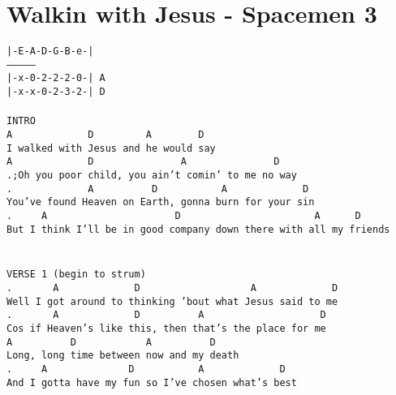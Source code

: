 \newpage
\section{Walkin with Jesus - Spacemen 3}
\label{Walkin with Jesus - Spacemen 3}
\texttt{|-E-A-D-G-B-e-|\\
---------------\\
|-x-0-2-2-2-0-|\ A\\
|-x-x-0-2-3-2-|\ D\\
\\
INTRO\\
A\ \ \ \ \ \ \ \ \ \ \ \ \ D\ \ \ \ \ \ \ \ \ A\ \ \ \ \ \ \ \ D\\
I\ walked\ with\ Jesus\ and\ he\ would\ say\\
A\ \ \ \ \ \ \ \ \ \ \ \ \ D\ \ \ \ \ \ \ \ \ \ \ \ \ \ \ A\ \ \ \ \ \ \ \ \ \ \ \ \ \ \ D\\
.;Oh\ you\ poor\ child,\ you\ ain't\ comin'\ to\ me\ no\ way\\
. \ \ \ \ \ \ \ \ \ \ \ \ A\ \ \ \ \ \ \ \ \ \ D\ \ \ \ \ \ \ \ \ \ \ A\ \ \ \ \ \ \ \ \ \ \ \ \ D\\
You've\ found\ Heaven\ on\ Earth,\ gonna\ burn\ for\ your\ sin\;\\
. \ \ \ \ A\ \ \ \ \ \ \ \ \ \ \ \ \ \ \ \ \ \ \ \ \ \ D\ \ \ \ \ \ \ \ \ \ \ \ \ \ \ \ \ \ \ \ \ \ \ A\ \ \ \ \ \ D\\
But\ I\ think\ I'll\ be\ in\ good\ company\ down\ there\ with\ all\ my\ friends\\
\\
\\
VERSE\ 1\ (begin\ to\ strum)\\
. \ \ \ \ \ \ A\ \ \ \ \ \ \ \ \ \ \ \ \ D\ \ \ \ \ \ \ \ \ \ \ \ \ \ \ \ \ \ \ A\ \ \ \ \ \ \ \ \ \ \ \ \ D\\
Well\ I\ got\ around\ to\ thinking\ 'bout\ what\ Jesus\ said\ to\ me\\
. \ \ \ \ \ \ A\ \ \ \ \ \ \ \ \ \ \ \ \ D\ \ \ \ \ \ \ \ \ \ A\ \ \ \ \ \ \ \ \ \ \ \ \ \ \ \ \ \ \ \ D\\
Cos\ if\ Heaven's\ like\ this,\ then\ that's\ the\ place\ for\ me\\
A\ \ \ \ \ \ \ \ \ \ D\ \ \ \ \ \ \ \ \ \ \ \ A\ \ \ \ \ \ \ \ \ \ D\\
Long,\ long\ time\ between\ now\ and\ my\ death\\
. \ \ \ \ A\ \ \ \ \ \ \ \ \ \ \ \ \ \ D\ \ \ \ \ \ \ \ \ \ \ A\ \ \ \ \ \ \ \ \ \ \ \ \ D\\
And\ I\ gotta\ have\ my\ fun\ so\ I've\ chosen\ what's\ best\\
}
